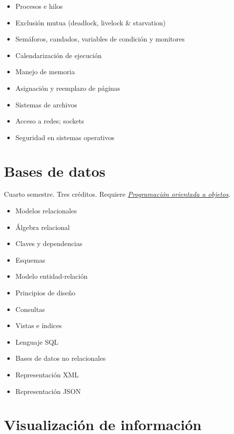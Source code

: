 \documentclass{article}
\begin{document}
\begin{multicols}{4}
\begin{itemize}
\item{Procesos e hilos}
\item{Exclusi\'{o}n mutua (deadlock, livelock \& starvation)}
\item{Sem\'{a}foros, candados, variables de condici\'{o}n y monitores}
\item{Calendarizaci\'{o}n de ejecuci\'{o}n}
\item{Manejo de memoria}
\item{Asignaci\'{o}n y reemplazo de p\'{a}ginas}
\item{Sistemas de archivos}
\item{Acceso a redes; sockets}
\item{Seguridad en sistemas operativos}
\end{itemize}

\vfill\null \columnbreak

\hypertarget{bdd}{\section*{Bases de datos}}    

Cuarto semestre. Tres cr\'{e}ditos. Requiere \hyperlink{poao}{\em
  Programaci\'{o}n orientada a objetos}.

\begin{itemize}
\item{Modelos relacionales}
\item{\'{A}lgebra relacional}
\item{Claves y dependencias}
\item{Esquemas}
\item{Modelo entidad-relaci\'{o}n}
\item{Principios de dise\~{n}o}
\item{Consultas}
\item{Vistas e \'{i}ndices}
\item{Lenguaje SQL}
\item{Bases de datos no relacionales}
\item{Representaci\'{o}n XML}
\item{Representaci\'{o}n JSON}  
\end{itemize}

\vfill\null \columnbreak

\hypertarget{vdi}{\section*{Visualizaci\'{o}n de informaci\'{o}n}}


\end{multicols}
\end{document}
